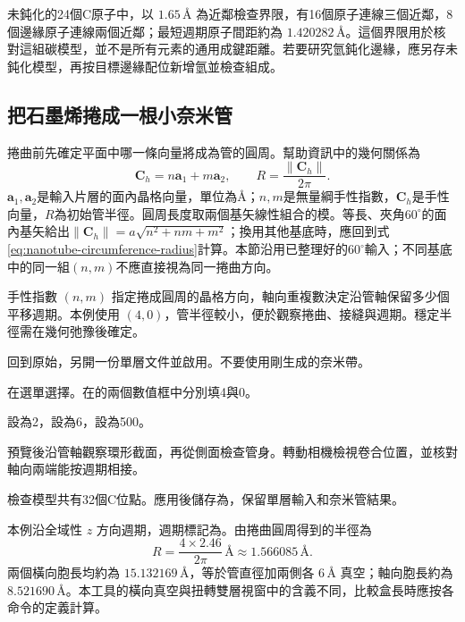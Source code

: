 未鈍化的24個C原子中，以 $1.65\,\text{\AA}$ 為近鄰檢查界限，有16個原子連線三個近鄰，8個邊緣原子連線兩個近鄰；最短週期原子間距約為 $1.420282\,\text{\AA}$。這個界限用於核對這組碳模型，並不是所有元素的通用成鍵距離。若要研究氫鈍化邊緣，應另存未鈍化模型，再按目標邊緣配位新增氫並檢查組成。

\subsection{把石墨烯捲成一根小奈米管}

捲曲前先確定平面中哪一條向量將成為管的圓周。幫助資訊中的幾何關係為
\begin{equation}
  \mathbf C_h=n\mathbf a_1+m\mathbf a_2,
  \qquad R=\frac{\|\mathbf C_h\|}{2\pi}.
  \label{eq:nanotube-circumference-radius}
\end{equation}
$\mathbf a_1,\mathbf a_2$是輸入片層的面內晶格向量，單位為\AA；$n,m$是無量綱手性指數，$\mathbf C_h$是手性向量，$R$為初始管半徑。圓周長度取兩個基矢線性組合的模。等長、夾角$60^\circ$的面內基矢給出$\|\mathbf C_h\|=a\sqrt{n^2+nm+m^2}$；換用其他基底時，應回到式\eqref{eq:nanotube-circumference-radius}計算。本節沿用已整理好的$60^\circ$輸入；不同基底中的同一組$(n,m)$不應直接視為同一捲曲方向。



手性指數 $(n,m)$ 指定捲成圓周的晶格方向，軸向重複數決定沿管軸保留多少個平移週期。本例使用 $(4,0)$，管半徑較小，便於觀察捲曲、接縫與週期。穩定半徑需在幾何弛豫後確定。

\begin{steps}
  \item 回到原始，另開一份單層文件並啟用。不要使用剛生成的奈米帶。
  \item 在選單選擇。在的兩個數值框中分別填4與0。
  \item {}設為2，設為6，設為500。
  \item 預覽後沿管軸觀察環形截面，再從側面檢查管身。轉動相機檢視卷合位置，並核對軸向兩端能按週期相接。
  \item 檢查模型共有32個C位點。應用後儲存為，保留單層輸入和奈米管結果。
\end{steps}

本例沿全域性 $z$ 方向週期，週期標記為。由捲曲圓周得到的半徑為
\[
 R=\frac{4\times2.46}{2\pi}\,\text{\AA}\approx1.566085\,\text{\AA}.
\]
兩個橫向胞長均約為 $15.132169\,\text{\AA}$，等於管直徑加兩側各 $6\,\text{\AA}$ 真空；軸向胞長約為 $8.521690\,\text{\AA}$。本工具的橫向真空與扭轉雙層視窗中的含義不同，比較盒長時應按各命令的定義計算。

